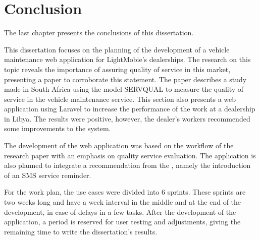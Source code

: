 \chapter{Conclusion}%
\label{chapter:conclusion}

\begin{introduction}
The last chapter presents the conclusions of this dissertation.
\end{introduction} 


This dissertation focuses on the planning of the development of a vehicle maintenance web application for LightMobie's dealerships. 
The research on this topic reveals the importance of assuring quality of service in this market, presenting a paper to corroborate this statement.
The paper describes a study made in South Africa using the model SERVQUAL to measure the quality of service in the vehicle maintenance service.
This section also presents a web application using Laravel to increase the performance of the work at a dealership in Libya. 
The results were positive, however, the dealer's workers recommended some improvements to the system.

The development of the web application was based on the workflow of the research paper with an emphasis on quality service evaluation.
The application is also planned to integrate a recommendation from the \citet{MAS_MOTORS}, namely the introduction of an SMS service reminder. 

For the work plan, the use cases were divided into 6 sprints. 
These sprints are two weeks long and have a week interval in the middle and at the end of the development, in case of delays in a few tasks.
After the development of the application, a period is reserved for user testing and adjustments, giving the remaining time to write the dissertation's results.

